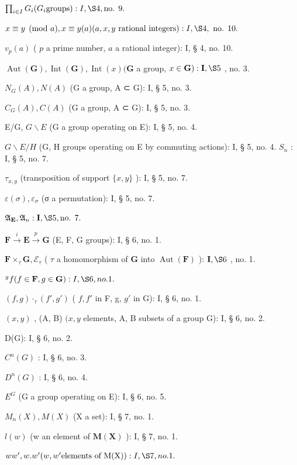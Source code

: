\(\prod_{i \in I} G_i (G_i \text{groups}) : I, \S 4, \text{no. } 9.\)

\(x \equiv y \pmod{a}, x \equiv y (a) (a, x, y \text{ rational integers}) : I, \S 4, \text{ no. } 10.\)

\(v_{p}(a)\) ( \(p\) a prime number, \(a\) a rational integer): I, § 4, no. 10.

\(\operatorname{Aut}(\mathbf{G}), \operatorname{Int}(\mathbf{G}), \operatorname{Int}(x) (\mathbf{G}\) a group, \(x \in \mathbf{G}) : \mathbf{I}, \S 5\) , no. 3.

\(N_{G}(A), N(A)\) (G a group, A ⊂ G): I, § 5, no. 3.

\(C_{G}(A), C(A)\) (G a group, A ⊂ G): I, § 5, no. 3.

E/G, \(G\backslash E\) (G a group operating on E): I, § 5, no. 4.

\(G\backslash E/H\) (G, H groups operating on E by commuting actions): I, § 5, no. 4. \(S_{n}\) : I, § 5, no. 7.

\(\tau_{x,y}\) (transposition of support \(\{x,y\}\) ): I, § 5, no. 7.

\(\varepsilon (\sigma),\varepsilon_{\sigma}\) (σ a permutation): I, § 5, no. 7.

\(\mathfrak{A}_{\mathbf{E}}, \mathfrak{A}_n: \mathbf{I}, \S 5, \text{no. } 7.\)

\(\mathbf{F} \xrightarrow{i} \mathbf{E} \xrightarrow{p} \mathbf{G}\) (E, F, G groups): I, § 6, no. 1.

\(\mathbf{F} \times_{\tau} \mathbf{G}, \mathcal{E}_{\tau}\) ( \(\tau\) a homomorphism of \(\mathbf{G}\) into \(\operatorname{Aut}(\mathbf{F})\) ): \(\mathbf{I}, \S 6\) , no. 1.

\(^{g}f(f\in\mathbf{F},g\in\mathbf{G}):I,\S6,no.1.\)

\((f,g)\cdot_{\tau}(f',g')\) ( \(f,f'\) in F, g, \(g'\) in G): I, § 6, no. 1.

\((x,y)\) , (A, B) \((x,y\) elements, A, B subsets of a group G): I, § 6, no. 2.

D(G): I, § 6, no. 2.

\(C^{n}(G)\) : I, § 6, no. 3.

\(D^{n}(G)\) : I, § 6, no. 4.

\(E^{G}\) (G a group operating on E): I, § 6, no. 5.

\(M_{n}(X), M(X)\) (X a set): I, § 7, no. 1.

\(l(w)\) (w an element of \(\mathbf{M}(\mathbf{X})\) ): I, § 7, no. 1.

\(ww', w.w' (w, w'\text{elements of M(X)}): I, \S 7, no. 1.\)

